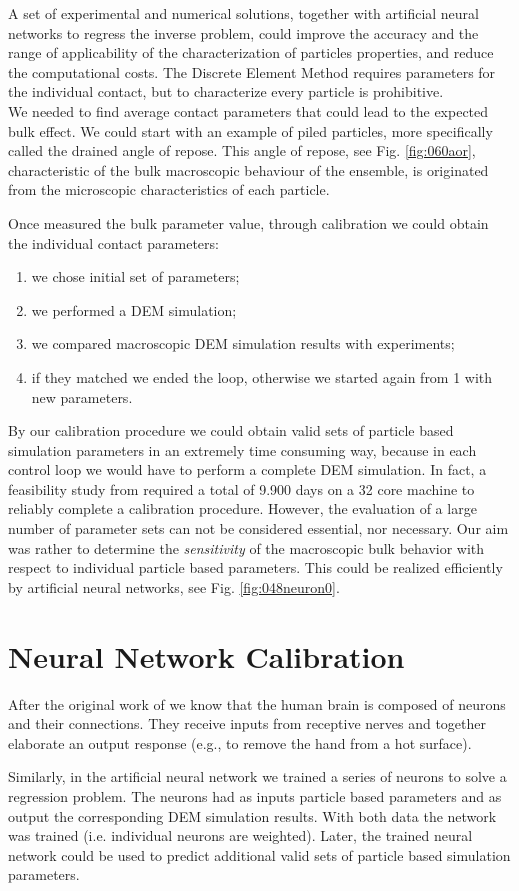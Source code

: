 A set of experimental and numerical solutions, together with artificial neural
networks to regress the inverse problem, could improve the accuracy and the
range of applicability of the characterization of particles properties, and reduce the computational costs.
The Discrete Element Method requires parameters for the individual contact, but
to characterize every particle is prohibitive.\\
We needed to find average contact parameters that could lead to the expected
bulk effect.
We could start with an example of piled particles, more specifically called the
drained angle of repose. This angle of repose, see Fig. \ref{fig:060aor},
characteristic of the bulk macroscopic behaviour of the ensemble, is originated from the microscopic
characteristics of each particle.

Once measured the bulk parameter value, through calibration we could obtain the
individual contact parameters:
\begin{enumerate}
\item{we chose initial set of parameters;}
\item{we performed a \acs{DEM} simulation;}
\item{we compared macroscopic \acs{DEM} simulation results with experiments;}
\item{if they matched we ended the loop, otherwise we started again from 1 with
new parameters.}
\end{enumerate}
By our calibration procedure we could obtain valid sets of particle based
simulation parameters in an extremely time consuming way, because in each
control loop we would have to perform a complete \acs{DEM} simulation.
In fact, a feasibility study from \citet{RefWorks:173}
required a total of
9.900 days on a 32 core machine to reliably complete a calibration procedure.
However, the evaluation of a large number of parameter sets can not be
considered essential, nor necessary. 
Our aim was rather to determine the \textit{sensitivity} 
of the macroscopic bulk behavior with respect to individual particle based parameters.
This could be realized efficiently by artificial neural networks, see Fig.
\ref{fig:048neuron0}. 

\section{Neural Network Calibration}
\label{sec:neuralnetworkcalibration}

After the original work of \citet{RefWorks:189} we know that the human brain is
composed of neurons and their connections. 
They receive inputs from receptive
nerves and together elaborate an output response (e.g., to remove the hand from
a hot surface).

Similarly, in the artificial neural network we trained a series of neurons to
solve a regression problem.
The neurons had
as inputs particle based parameters and as output the corresponding \acs{DEM}
simulation results.
With both data the network was trained (i.e. individual neurons are
weighted).
Later, the trained neural network could be used to predict additional valid sets
of particle based simulation parameters.

